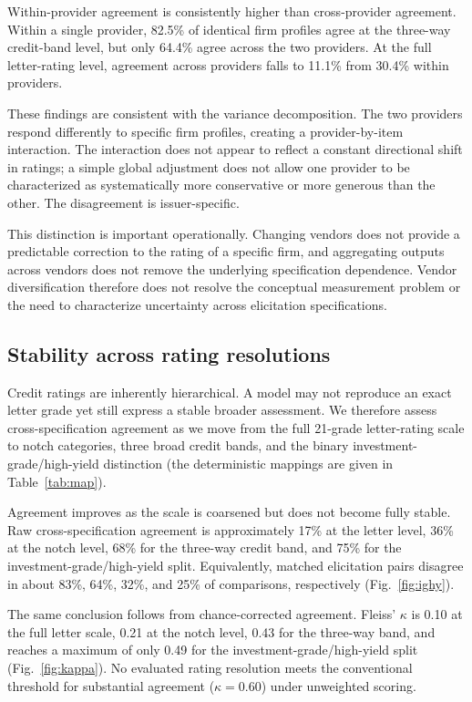 \documentclass[a4paper,fleqn]{cas-sc}
\begin{document}
Within-provider agreement is consistently higher than cross-provider agreement. Within a single provider,
82.5\% of identical firm profiles agree at the three-way credit-band level, but only 64.4\% agree across
the two providers. At the full letter-rating level, agreement across providers falls to 11.1\% from
30.4\% within providers.

These findings are consistent with the variance decomposition. The two providers respond differently to
specific firm profiles, creating a provider-by-item interaction. The interaction does not appear to
reflect a constant directional shift in ratings; a simple global adjustment does not allow one provider to
be characterized as systematically more conservative or more generous than the other. The disagreement is
issuer-specific.

This distinction is important operationally. Changing vendors does not provide a predictable correction
to the rating of a specific firm, and aggregating outputs across vendors does not remove the underlying
specification dependence. Vendor diversification therefore does not resolve the conceptual measurement
problem or the need to characterize uncertainty across elicitation specifications.

\subsection{Stability across rating resolutions}
Credit ratings are inherently hierarchical. A model may not reproduce an exact letter grade yet still
express a stable broader assessment. We therefore assess cross-specification agreement as we move from
the full 21-grade letter-rating scale to notch categories, three broad credit bands, and the binary
investment-grade/high-yield distinction (the deterministic mappings are given in Table~\ref{tab:map}).

Agreement improves as the scale is coarsened but does not become fully stable. Raw cross-specification
agreement is approximately 17\% at the letter level, 36\% at the notch level, 68\% for the three-way
credit band, and 75\% for the investment-grade/high-yield split. Equivalently, matched elicitation pairs
disagree in about 83\%, 64\%, 32\%, and 25\% of comparisons, respectively (Fig.~\ref{fig:ighy}).

The same conclusion follows from chance-corrected agreement. Fleiss' $\kappa$ is 0.10 at the full letter
scale, 0.21 at the notch level, 0.43 for the three-way band, and reaches a maximum of only 0.49 for the
investment-grade/high-yield split (Fig.~\ref{fig:kappa}). No evaluated rating resolution meets the
conventional threshold for substantial agreement ($\kappa=0.60$) under unweighted scoring.
\end{document}
